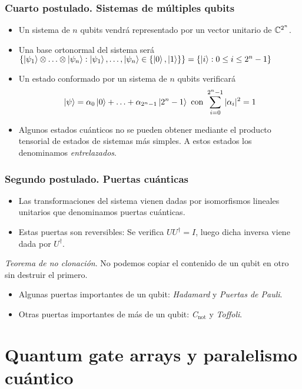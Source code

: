 \documentclass{beamer}
\begin{document}
\begin{frame}
	\frametitle{Cuarto postulado. Sistemas de múltiples qubits}
	
	\begin{itemize}
	\item Un sistema de $n$ qubits vendrá representado por un vector unitario de $\mathbb{C}^{2^n}$.
	\item Una base ortonormal del sistema será $\{\left|\psi_1\right\rangle\otimes\hdots\otimes\left|\psi_n\right\rangle:\left|\psi_1\right\rangle,\hdots,\left|\psi_n\right\rangle\in\{\left|0\right\rangle,\left|1\right\rangle\}\}=\{\left|i\right\rangle: 0\leq i\leq 2^n-1\}$
	\item Un estado conformado por un sistema de $n$ qubits verificará
	$$\left|\psi\right\rangle=\alpha_0\left|0\right\rangle+\hdots+\alpha_{2^n-1}\left|2^n-1\right\rangle\textrm{ con }\sum_{i=0}^{2^n-1}|\alpha_i|^2=1$$
	\item Algunos estados cuánticos no se pueden obtener mediante el producto tensorial de estados de sistemas más simples. A estos estados los denominamos \emph{entrelazados}.
	\end{itemize}
\end{frame}

\begin{frame}
	\frametitle{Segundo postulado. Puertas cuánticas}
	\begin{itemize}
 	\item Las transformaciones del sistema vienen dadas por isomorfismos lineales unitarios que denominamos puertas cuánticas.
 	\item Estas puertas son reversibles: Se verifica $UU^\dag=I$, luego dicha inversa viene dada por $U^\dag$.
	\end{itemize}
	\begin{thm} \emph{Teorema de no clonación}. No podemos copiar el contenido de un qubit en otro sin destruir el primero.
	\end{thm}
	\begin{itemize}
 	\item Algunas puertas importantes de un qubit: \emph{Hadamard} y \emph{Puertas de Pauli}.
 	\item Otras puertas importantes de más de un qubit: \emph{C$_\mathrm{not}$ } y \emph{Toffoli}.
	\end{itemize}
\end{frame}
\section{Quantum gate arrays y paralelismo cuántico}
\end{document}
